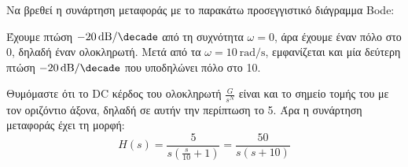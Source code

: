 \documentclass[11pt,a4paper,notitlepage,fleqn]{article}
\begin{document}
\begin{exercise}
Να βρεθεί η συνάρτηση μεταφοράς με το παρακάτω προσεγγιστικό διάγραμμα Bode:


\tcblower
Έχουμε πτώση \( \SI{-20}{\decibel/\decade} \) από τη συχνότητα \( \omega = 0 \), άρα έχουμε
έναν πόλο στο 0, δηλαδή έναν ολοκληρωτή. Μετά από τα \( \omega = \SI{10}{\radian/\second} \),
εμφανίζεται και μία δεύτερη πτώση \( \SI{-20}{\decibel/\decade} \) που υποδηλώνει πόλο
στο 10.

Θυμόμαστε ότι το DC κέρδος του ολοκληρωτή \( \frac{G}{s^N} \) είναι και το σημείο τομής
του με τον οριζόντιο άξονα, δηλαδή σε αυτήν την περίπτωση το 5. Άρα η συνάρτηση
μεταφοράς έχει τη μορφή:
\[
H(s) = \frac{5}{s\left(\frac{s}{10}+1\right)} = \frac{50}{s(s+10)}
\]
\end{exercise}
\end{document}
